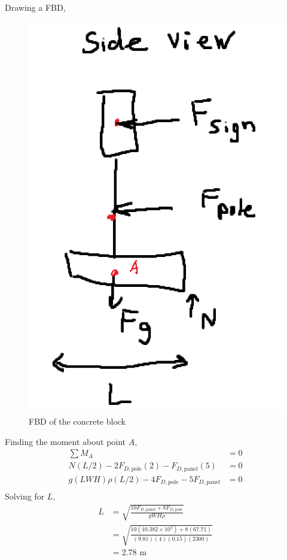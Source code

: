 \subsection{}
Drawing a FBD, 
\begin{figure}[h]
    \centering
    \includegraphics[width=0.5\linewidth]{Questions/Figures/Q3FBD.png}
    \caption{FBD of the concrete block}
    \label{fig:Q3FBD}
\end{figure}

Finding the moment about point $A$,
\begin{align*}
    \sum M_A &= 0 \\
    N (L/2) - 2F_{D,\text{pole}} (2) - F_{D,\text{panel}} (5) &= 0 \\
    g(L W H)\rho (L/2) - 4F_{D,\text{pole}} - 5F_{D,\text{panel}} &= 0 \\
\end{align*}
Solving for $L$,
\begin{align*}
    L &= \sqrt{\frac{10F_{D,\text{panel}} + 8F_{D,\text{pole}}}{g W H \rho}} \\
      &= \sqrt{\frac{10(10.382 \times 10^3) + 8(67.71)}{(9.81)(4)(0.15)(2300)}} \\
      &= \boxed{2.78 \text{ m}}
\end{align*}